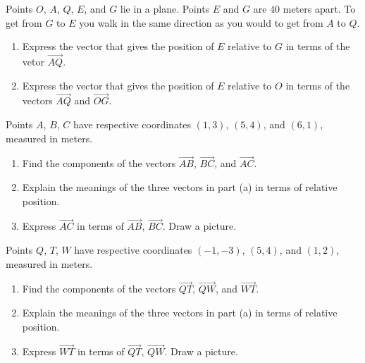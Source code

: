 \documentclass{ximera}
\begin{document}
\begin{question} \label{QLddferFefrer}
Points $O$, $A$, $Q$, $E$, and $G$ lie in a plane. Points $E$ and $G$ are $40$ meters apart. To get from $G$ to $E$ you walk in the same direction as you would to get from $A$ to $Q$.

\begin{enumerate}
\item Express the vector that gives the position of $E$ relative to $G$ in terms of the vetor $\overrightarrow{AQ}$.

\item Express the vector that gives the position of $E$ relative to $O$ in terms of the vectors $\overrightarrow{AQ}$ and $\overrightarrow{OG}$.
\end{enumerate}
\end{question}


\begin{question}  \label{QMNDVBed43}
Points $A$, $B$, $C$ have respective coordinates $(1,3)$, $(5,4)$, and $(6,1)$, measured in meters.
\begin{enumerate}
\item Find the components of the vectors $\overrightarrow{AB}$, $\overrightarrow{BC}$, and $\overrightarrow{AC}$.

\item Explain the meanings of the three vectors in part (a) in terms of relative position.

\item Express $\overrightarrow{AC}$ in terms of $\overrightarrow{AB}$, $\overrightarrow{BC}$. Draw a picture.
\end{enumerate}

\end{question}

\begin{question} \label{QDFEUJZXFedd}
Points $Q$, $T$, $W$ have respective coordinates $(-1,-3)$, $(5,4)$, and $(1,2)$, measured in meters.

\begin{enumerate}
\item Find the components of the vectors $\overrightarrow{QT}$, $\overrightarrow{QW}$, and $\overrightarrow{WT}$.

\item Explain the meanings of the three vectors in part (a) in terms of relative position.

\item Express $\overrightarrow{WT}$ in terms of $\overrightarrow{QT}$, $\overrightarrow{QW}$. Draw a picture.
\end{enumerate}

\end{question}
\end{document}
